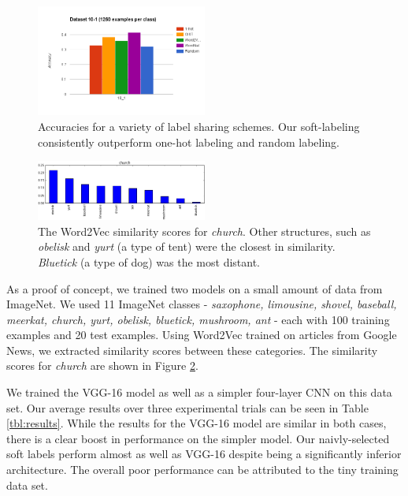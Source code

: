\begin{figure}[!tb]
  \centering
  \includegraphics[width=0.5\textwidth]{figs/10_1-train_1260.png}
  \caption{
      Accuracies for a variety of label sharing schemes. Our soft-labeling
      consistently outperform one-hot labeling and random labeling.
  }
  \label{fig:10_1-train_100}
\end{figure}

\begin{figure}[!tb]
  \centering
  \includegraphics[width=0.5\textwidth]{figs/word2vec_church.png}
  \caption{
    The Word2Vec similarity scores for \emph{church}. Other structures, such as
    \emph{obelisk} and \emph{yurt} (a type of tent) were the closest in
    similarity. \emph{Bluetick} (a type of dog) was the most distant.
  }
  \label{fig:word2vec_similarities}
\end{figure}

As a proof of concept, we trained two models on a small amount of data from
ImageNet. We used 11 ImageNet classes -
\emph{
  saxophone,
  limousine,
  shovel,
  baseball,
  meerkat,
  church,
  yurt,
  obelisk,
  bluetick,
  mushroom,
  ant
} -
each with 100 training examples and 20 test examples.
Using Word2Vec trained on articles from Google News, we extracted similarity
scores between these categories. The similarity scores for \emph{church} are
shown in Figure \ref{fig:word2vec_similarities}.

We trained the VGG-16 model as well as a simpler four-layer CNN on this data
set. Our average results over three experimental trials can be seen in Table
\ref{tbl:results}.
While the results for the VGG-16 model are similar in both cases, there is a
clear boost in performance on the simpler model. Our naivly-selected soft
labels perform almost as well as VGG-16 despite being a significantly inferior
architecture.
The overall poor performance can be attributed to the tiny training data set.

